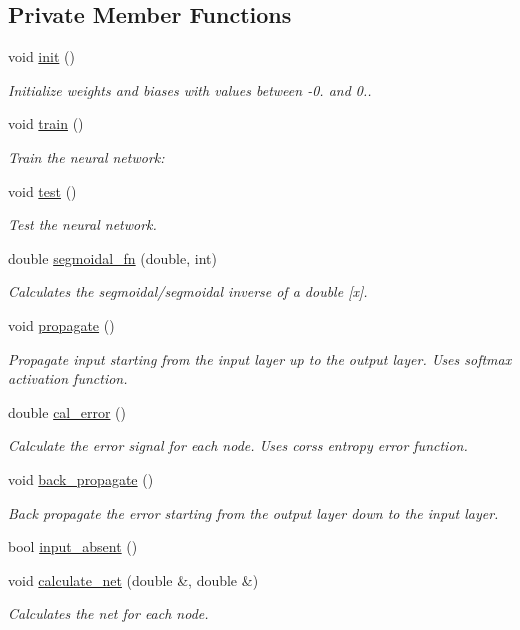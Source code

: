 \subsection*{Private Member Functions}
\begin{DoxyCompactItemize}
\item 
void \hyperlink{a00003_ac86567c994bb671c20ed50316d268d3b}{init} ()
\begin{DoxyCompactList}\small\item\em Initialize weights and biases with values between -\/0. and 0.. \end{DoxyCompactList}\item 
void \hyperlink{a00003_a033f4f60812c0359cc50815e957f11f7}{train} ()
\begin{DoxyCompactList}\small\item\em Train the neural network\-: \end{DoxyCompactList}\item 
void \hyperlink{a00003_a38193cc61e9affbd077c1c6089fd0889}{test} ()
\begin{DoxyCompactList}\small\item\em Test the neural network. \end{DoxyCompactList}\item 
double \hyperlink{a00003_a7a8eff736645e4101ed906a46e6a27ac}{segmoidal\-\_\-fn} (double, int)
\begin{DoxyCompactList}\small\item\em Calculates the segmoidal/segmoidal inverse of a double \mbox{[}x\mbox{]}. \end{DoxyCompactList}\item 
void \hyperlink{a00003_a7e6d776ecfbb4f9df682d5fe13a7ec3b}{propagate} ()
\begin{DoxyCompactList}\small\item\em Propagate input starting from the input layer up to the output layer. Uses softmax activation function. \end{DoxyCompactList}\item 
double \hyperlink{a00003_a3e503ddab5bbc51f6e0b79b67ca6ed2f}{cal\-\_\-error} ()
\begin{DoxyCompactList}\small\item\em Calculate the error signal for each node. Uses corss entropy error function. \end{DoxyCompactList}\item 
void \hyperlink{a00003_a5a0cac77d13e3ffdd3088cb684d39859}{back\-\_\-propagate} ()
\begin{DoxyCompactList}\small\item\em Back propagate the error starting from the output layer down to the input layer. \end{DoxyCompactList}\item 
bool \hyperlink{a00003_a3d073d4957def9b6a4498448260fedeb}{input\-\_\-absent} ()
\item 
void \hyperlink{a00003_a25df8564c3f26b64935464366055572e}{calculate\-\_\-net} (double \&, double \&)
\begin{DoxyCompactList}\small\item\em Calculates the net for each node. \end{DoxyCompactList}\end{DoxyCompactItemize}

